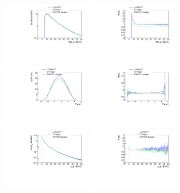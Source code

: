 \begin{figure}[h!]
\includegraphics[width=0.4\textwidth]{figures/Mll_inc.pdf}
\includegraphics[width=0.4\textwidth]{figures/RatioMll_inc.pdf}
\includegraphics[width=0.4\textwidth]{figures/Yll_inc.pdf}
\includegraphics[width=0.4\textwidth]{figures/RatioYll_inc.pdf}
\includegraphics[width=0.4\textwidth]{figures/pTl_inc.pdf}
\includegraphics[width=0.4\textwidth]{figures/RatiopTl_inc.pdf}

\end{figure}
